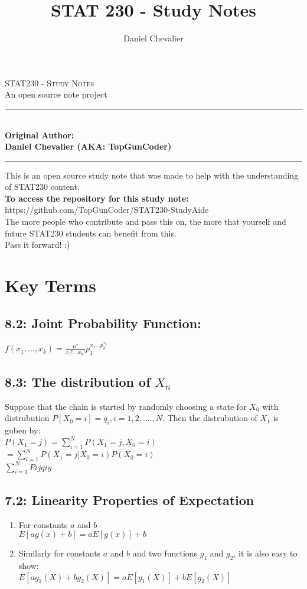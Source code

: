 \documentclass[11pt]{article}
\author{Daniel Chevalier}
\title{STAT 230 - Study Notes}
\newcommand{\HRule}{\rule{\linewidth}{0.5mm}}
\begin{document}
	\begin{titlepage}
		\begin{center}
			\textsc{\LARGE STAT230 - Study Notes}\\
			{\Large An open source note project}\\

			
			\HRule\\
				{\large \bf Original Author:\\ Daniel Chevalier (AKA: TopGunCoder)}
			\HRule
			
			This is an open source study note that was made to help with the understanding of STAT230 content.\\
			
			{\large \bf To access the repository for this study note:}\\
			https://github.com/TopGunCoder/STAT230-StudyAide\\
			The more people who contribute and pass this on, the more that yourself and future STAT230 students can benefit from this.\\
			Pass it forward! :)
		\end{center}
	\end{titlepage}

\newpage
\section*{Key Terms}
	\subsection*{8.2: Joint Probability Function:}
		$f(x_1,...,x_k)=\frac{n!}{x_1!...x_k!}p_1^{x_1...p_k^{x_k}}$
	
	\subsection*{8.3: The distribution of $X_n$}
		Suppose that the chain is started by randomly choosing a state for $X_0$ with distrubution $P[X_0=i]=q_i,i=1,2,....,N$. Then the distrubution of $X_1$ is guben by:\\
		$P(X_1=j)=\sum_{i=1}^{N}P(X_1=j,X_0=i)$\\
		$=\sum^N_{i=1}P(X_1=j|X_0=i)P(X_0=i)$\\
		$\sum_{i=1}^N Pijqiy$
	\subsection*{7.2: Linearity Properties of Expectation}
		\begin{enumerate}
			\item For constants $a$ and $b$		\\
			$E[ag(x)+b]=aE[g(x)]+b$
			\item Similarly for constants $a$ and $b$ and two functions $g_1$ and $g_2$, it is also easy to show:\\
			$E[ag_1(X)+bg_2(X)]=aE[g_1(X)]+bE[g_2(X)]$
		\end{enumerate}
	
\end{document}
